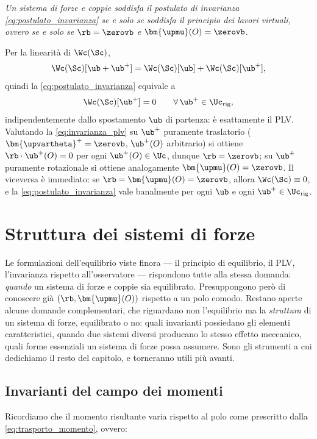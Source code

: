 \medskip

	\emph{Un sistema di forze e coppie soddisfa il postulato di invarianza
	\eqref{eq:postulato_invarianza} se e solo se soddisfa il principio dei
	lavori virtuali, ovvero se e solo se $\rb=\zerovb$ e $\bm{\upmu}(O)=\zerovb$.}
	
	\medskip



	Per la linearità di $\Wc(\Sc)$,
	\[
	\Wc(\Sc)[\ub+\ub^+] = \Wc(\Sc)[\ub] + \Wc(\Sc)[\ub^+],
	\]
	quindi la \eqref{eq:postulato_invarianza} equivale a
	\begin{equation}\label{eq:invarianza_plv}
		\Wc(\Sc)[\ub^+] = 0 \qquad \forall\,\ub^+\in\Uc_{\rm rig},
	\end{equation}
	indipendentemente dallo spostamento $\ub$ di partenza: è esattamente il PLV.
	Valutando la \eqref{eq:invarianza_plv} su $\ub^+$ puramente
	traslatorio ($\bm{\upvartheta}^+=\zerovb$, $\ub^+(O)$
	arbitrario) si ottiene $\rb\cdot\ub^+(O)=0$ per ogni
	$\ub^+(O)\in\Uc$, dunque $\rb=\zerovb$; su $\ub^+$
	puramente rotazionale si ottiene analogamente
	$\bm{\upmu}(O)=\zerovb$. Il viceversa è immediato: se
	$\rb=\bm{\upmu}(O)=\zerovb$, allora $\Wc(\Sc)\equiv 0$, e la
	\eqref{eq:postulato_invarianza} vale banalmente per ogni $\ub$ e
	ogni $\ub^+\in\Uc_{\rm rig}$.

\section{Struttura dei sistemi di forze}\label{sec:struttura_sistemi_forze}

Le formulazioni dell'equilibrio viste finora ---  il principio di equilibrio, il
PLV, l'invarianza rispetto all'osservatore --- rispondono tutte alla stessa
domanda: \textit{quando} un sistema di forze e coppie sia equilibrato.
Presuppongono però di conoscere già $(\rb,\bm{\upmu}(O))$ rispetto a un
polo comodo. Restano aperte alcune domande complementari, che riguardano
non l'equilibrio ma la \textit{struttura} di un sistema di forze,
equilibrato o no: quali invarianti possiedano gli elementi caratteristici, quando due sistemi diversi
producano lo stesso effetto meccanico, quali forme essenziali un sistema
di forze possa assumere. Sono gli strumenti a cui dedichiamo il resto del
capitolo, e torneranno utili più avanti.



\subsection{Invarianti del campo dei momenti}\label{sec:invarianti_F}
Ricordiamo che il momento risultante varia rispetto al polo come prescritto dalla \eqref{eq:trasporto_momento}, ovvero:

